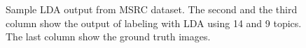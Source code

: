 \documentclass{acm_proc_article-sp}
\begin{document}
\begin{figure}[!htb]
{}
\caption{Sample LDA output from MSRC dataset. The second and the third column show the output of labeling with LDA using 14 and 9 topics. The last column show the ground truth images.}\label{fig:qual}
\end{figure}
\end{document}

